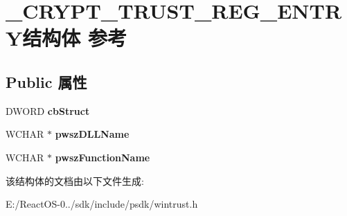 \hypertarget{struct___c_r_y_p_t___t_r_u_s_t___r_e_g___e_n_t_r_y}{}\section{\+\_\+\+C\+R\+Y\+P\+T\+\_\+\+T\+R\+U\+S\+T\+\_\+\+R\+E\+G\+\_\+\+E\+N\+T\+R\+Y结构体 参考}
\label{struct___c_r_y_p_t___t_r_u_s_t___r_e_g___e_n_t_r_y}
\subsection*{Public 属性}
\begin{DoxyCompactItemize}
\item 
\mbox{\label{struct___c_r_y_p_t___t_r_u_s_t___r_e_g___e_n_t_r_y_a92838ae8c4b504c0981a8d59d0aa061a}} 
D\+W\+O\+RD {\bfseries cb\+Struct}
\item 
\mbox{\label{struct___c_r_y_p_t___t_r_u_s_t___r_e_g___e_n_t_r_y_a24bd4c9158d77fd85965a0f4aef40829}} 
W\+C\+H\+AR $\ast$ {\bfseries pwsz\+D\+L\+L\+Name}
\item 
\mbox{\label{struct___c_r_y_p_t___t_r_u_s_t___r_e_g___e_n_t_r_y_aff827d5a8a277edb38f1ec6de0388866}} 
W\+C\+H\+AR $\ast$ {\bfseries pwsz\+Function\+Name}
\end{DoxyCompactItemize}


该结构体的文档由以下文件生成\+:\begin{DoxyCompactItemize}
\item 
E\+:/\+React\+O\+S-\/0../sdk/include/psdk/wintrust.\+h\end{DoxyCompactItemize}
